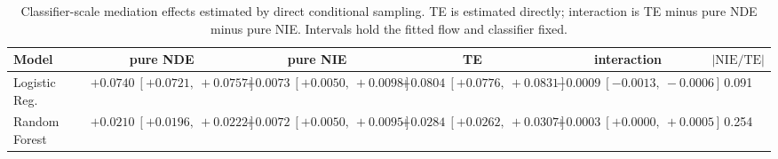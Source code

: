 \begin{table}[htbp]
  \centering
  \caption{Classifier-scale mediation effects estimated by direct conditional sampling. TE is estimated directly; interaction is TE minus pure NDE minus pure NIE. Intervals hold the fitted flow and classifier fixed.}
  \label{tab:german_gap_overall}
  \begin{tabular}{lccccc}
    \toprule
    Model & pure NDE & pure NIE & TE & interaction & $|\mathrm{NIE}/\mathrm{TE}|$ \\
    \midrule
    Logistic Reg. & $+0.0740\ [+0.0721,\ +0.0757]$ & $+0.0073\ [+0.0050,\ +0.0098]$ & $+0.0804\ [+0.0776,\ +0.0831]$ & $-0.0009\ [-0.0013,\ -0.0006]$ & 0.091 \\
    Random Forest & $+0.0210\ [+0.0196,\ +0.0222]$ & $+0.0072\ [+0.0050,\ +0.0095]$ & $+0.0284\ [+0.0262,\ +0.0307]$ & $+0.0003\ [+0.0000,\ +0.0005]$ & 0.254 \\
    \bottomrule
  \end{tabular}
\end{table}